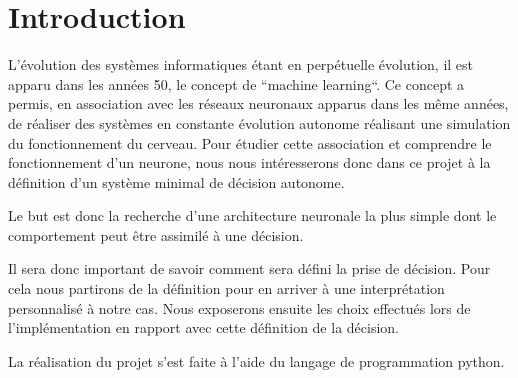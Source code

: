 \section*{Introduction}

L'évolution des systèmes informatiques étant en perpétuelle évolution, il est
apparu dans les années 50, le concept de ``machine learning``. Ce concept a
permis, en association avec les réseaux neuronaux apparus dans les même années,
de réaliser des systèmes en constante évolution autonome réalisant une
simulation du fonctionnement du cerveau.
Pour étudier cette association et comprendre le fonctionnement d'un neurone,
nous nous intéresserons donc dans ce projet à la définition d'un système minimal
de décision autonome.

Le but est donc la recherche d'une architecture neuronale la plus simple dont
le comportement peut être assimilé à une décision.

Il sera donc important de savoir comment sera défini la prise de décision. Pour
cela nous partirons de la définition pour en arriver à une interprétation
personnalisé à notre cas.
Nous exposerons ensuite les choix effectués lors de l'implémentation en rapport
avec cette définition de la décision.


La réalisation du projet s'est faite à l'aide du langage de programmation python.


